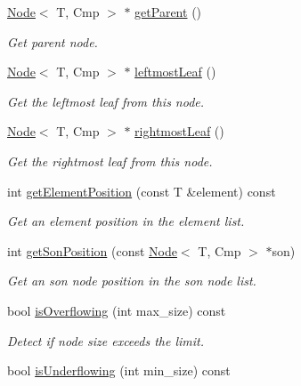 \begin{DoxyCompactItemize}
\hyperlink{classNode}{Node}$<$ T, Cmp $>$ $\ast$ \hyperlink{classNode_a553d92ca84d985c43b12441cc45f923f}{getParent} ()
\begin{DoxyCompactList}\small\item\em Get parent node. \item\end{DoxyCompactList}\item 
\hyperlink{classNode}{Node}$<$ T, Cmp $>$ $\ast$ \hyperlink{classNode_acf4013394930061e49269798379096a5}{leftmostLeaf} ()
\begin{DoxyCompactList}\small\item\em Get the leftmost leaf from this node. \item\end{DoxyCompactList}\item 
\hyperlink{classNode}{Node}$<$ T, Cmp $>$ $\ast$ \hyperlink{classNode_ae690ca45669e86b221d98a6c26b3eee4}{rightmostLeaf} ()
\begin{DoxyCompactList}\small\item\em Get the rightmost leaf from this node. \item\end{DoxyCompactList}\item 
int \hyperlink{classNode_a7c7b4c56f7674dd028270a1bb8f880c6}{getElementPosition} (const T \&element) const 
\begin{DoxyCompactList}\small\item\em Get an element position in the element list. \item\end{DoxyCompactList}\item 
int \hyperlink{classNode_accd225fa793ba391ae96f2d77306bf49}{getSonPosition} (const \hyperlink{classNode}{Node}$<$ T, Cmp $>$ $\ast$son)
\begin{DoxyCompactList}\small\item\em Get an son node position in the son node list. \item\end{DoxyCompactList}\item 
bool \hyperlink{classNode_af734f4709cebbb317cd213ef0678149d}{isOverflowing} (int max\_\-size) const 
\begin{DoxyCompactList}\small\item\em Detect if node size exceeds the limit. \item\end{DoxyCompactList}\item 
bool \hyperlink{classNode_ac34f1b0085e87487b771848d059f9e28}{isUnderflowing} (int min\_\-size) const 

\end{DoxyCompactItemize}
